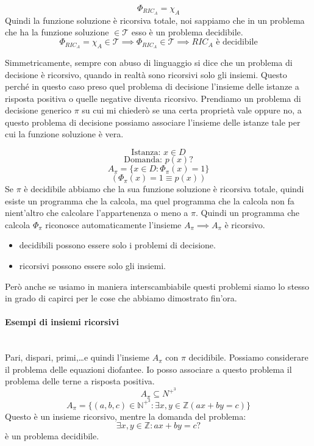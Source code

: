 \documentclass{article}
\begin{document}
$$\Phi_{RIC_A}=\chi_A$$
Quindi la funzione soluzione è ricorsiva totale, noi sappiamo che in un problema
che ha la funzione soluzione $\in\mathcal{T}$ esso è un problema decidibile.
$$\Phi_{RIC_A}=\chi_A\in\mathcal{T}\implies\Phi_{RIC_A}\in\mathcal{T}\implies RIC_A\text{ è decidibile}$$

Simmetricamente, sempre con abuso di linguaggio si dice che un problema di decisione è
ricorsivo, quando in realtà sono ricorsivi solo gli insiemi. Questo perché in questo
caso preso quel problema di decisione l'insieme delle istanze a risposta positiva
o quelle negative diventa ricorsivo.
Prendiamo un problema di decisione generico $\pi$ su cui mi chiederò se una certa
proprietà vale oppure no, a questo problema di decisione possiamo associare l'insieme
delle istanze tale per cui la funzione soluzione è vera.

$$\text{Istanza: }x\in D$$
$$\text{Domanda: }p(x)?$$
$$A_\pi=\{x\in D:\Phi_\pi(x)=1\}$$
$$\left(\Phi_\pi(x)=1\equiv p(x)\right)$$
Se $\pi$ è decidibile abbiamo che la sua funzione soluzione è ricorsiva totale, quindi
esiste un programma che la calcola, ma quel programma che la calcola non fa nient'altro che
calcolare l'appartenenza o meno a $\pi$. Quindi un programma che calcola $\Phi_\pi$
riconosce automaticamente l'insieme $A_\pi\implies A_\pi$ è ricorsivo.

\begin{itemize}
    \item decidibili possono essere solo i problemi di decisione.
    \item ricorsivi possono essere solo gli insiemi.
\end{itemize}
Però anche se usiamo in maniera interscambiabile questi problemi siamo lo stesso
in grado di capirci per le cose che abbiamo dimostrato fin'ora.


\paragraph{Esempi di insiemi ricorsivi}\mbox{}\\
Pari, dispari, primi,\dots e quindi l'insieme $A_\pi$ con $\pi$ decidibile.
Possiamo considerare il problema delle equazioni diofantee. Io posso associare
a questo problema il problema delle terne a risposta positiva.
$$A_\pi\subseteq N^{+^3}$$
$$A_\pi=\{(a,b,c)\in\mathbb{N}^{+^3}:\exists x,y\in\mathbb{Z}(ax+by=c)\}$$
Questo è un insieme ricorsivo, mentre la domanda del problema:
$$\exists x,y\in\mathbb{Z}:ax+by=c?$$
è un problema decidibile.
\end{document}
